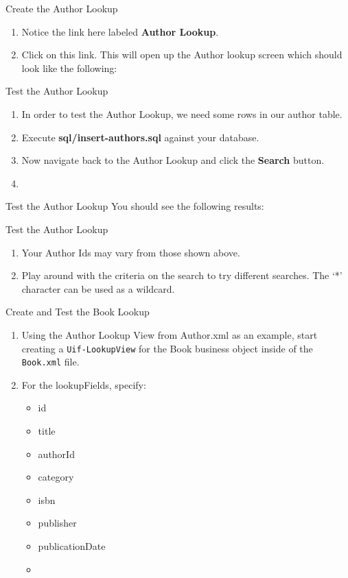 \documentclass[xcolor=dvipsnames,14pt,professionalfonts]{beamer}
\begin{document}
\begin{frame}{Create the Author Lookup}
  \begin{enumerate}
    \item Notice the link here labeled \textbf{Author Lookup}.  
    \item Click on this link. This will open up the Author lookup screen which should look like the following:
    \end{enumerate}
  \end{frame}

  \begin{frame}{Test the Author Lookup}
    \begin{enumerate}
    \item In order to test the Author Lookup, we need some rows in our author table.
      \item Execute \textbf{sql/insert-authors.sql} against your database.
      \item Now navigate back to the Author Lookup and click the
        \textbf{Search} button.
      \item 
      \end{enumerate}
    \end{frame}
    
    \begin{frame}{Test the Author Lookup}
      You should see the following results:
    \end{frame}
    
    \begin{frame}{Test the Author Lookup}
      \begin{enumerate}
      \item Your Author Ids may vary from those shown above.
      \item Play around with the criteria on the search to try
        different searches.  The ‘*’ character can be used as a
        wildcard.
      \end{enumerate}
    \end{frame}

    \begin{frame}{Create and Test the Book Lookup}
      \begin{enumerate}
        \item Using the Author Lookup View from Author.xml as an example, start creating a \texttt{Uif-LookupView} for the Book business object inside of the \texttt{Book.xml} file.
        \item For the lookupFields, specify:
          \begin{itemize}
            \item id
            \item title
            \item authorId
            \item category
            \item isbn
            \item publisher
            \item publicationDate
            \item 
            \end{itemize}
          \end{enumerate}
        \end{frame}
\end{document}
